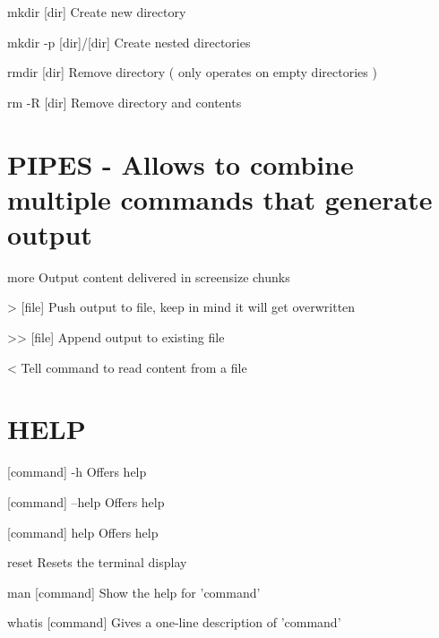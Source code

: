 \documentclass{article}
\begin{document}
 mkdir [dir]  Create new directory 

 mkdir -p [dir]/[dir]  Create nested directories 

 rmdir [dir]  Remove directory ( only operates on empty directories ) 

 rm -R [dir]  Remove directory and contents 
 
\section*{PIPES - Allows to combine multiple commands that generate output}

 more  Output content delivered in screensize chunks 

 > [file]  Push output to file, keep in mind it will get overwritten 

 >> [file]  Append output to existing file 

 <  Tell command to read content from a file 

\section*{HELP}

 [command] -h  Offers help 

 [command] --help  Offers help 

 [command] help  Offers help 

 reset  Resets the terminal display 

 man [command]  Show the help for 'command' 

 whatis [command]  Gives a one-line description of 'command' 
\end{document}
